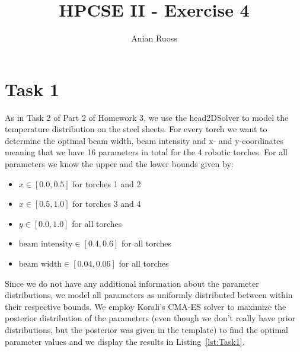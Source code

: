 \documentclass[11pt]{article}
\begin{document}
    \title{HPCSE II - Exercise 4}
    \author{Anian Ruoss}
    \maketitle

    \section*{Task 1}
    \label{sec:Task1}

    As in Task 2 of Part 2 of Homework 3, we use the head2DSolver to model
    the temperature distribution on the steel sheets.
    For every torch we want to determine the optimal beam width, beam
    intensity and x- and y-coordinates meaning that we have 16 parameters in
    total for the 4 robotic torches.
    For all parameters we know the upper and the lower bounds given by:
    \begin{itemize}
        \item $x \in [0.0, 0.5]$ for torches 1 and 2
        \item $x \in [0.5, 1.0]$ for torches 3 and 4
        \item $y \in [0.0, 1.0]$ for all torches
        \item $\text{beam intensity} \in [0.4, 0.6]$ for all torches
        \item $\text{beam width} \in [0.04, 0.06]$ for all torches
    \end{itemize}
    Since we do not have any additional information about the parameter
    distributions, we model all parameters as uniformly distributed
    between within their respective bounds.
    We employ Korali's CMA-ES solver to maximize the posterior
    distribution of the parameters (even though we don't really have prior
    distributions, but the posterior was given in the template) to find the
    optimal parameter values and we display the results in
    Listing~\ref{lst:Task1}.
\end{document}
